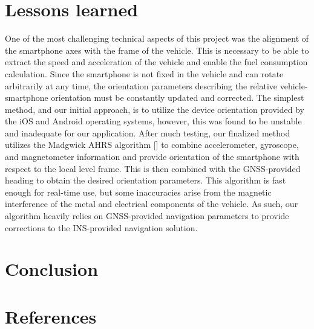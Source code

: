 \documentclass[11pt, oneside]{article}
\newcounter{refno}
\newcommand{\reflabel}[1]{\refstepcounter{refno}\label{#1}[\arabic{refno}]}  %
\begin{document}
\section{Lessons learned}

One of the most challenging technical aspects of this project was the alignment of the smartphone axes with the frame of the vehicle.  This is necessary to be able to extract the speed and acceleration of the vehicle and enable the fuel consumption calculation.  Since the smartphone is not fixed in the vehicle and can rotate arbitrarily at any time, the orientation parameters describing the relative vehicle-smartphone orientation must be constantly updated and corrected.  The simplest method, and our initial approach, is to utilize the device orientation provided by the iOS and Android operating systems, however, this was found to be unstable and inadequate for our application.  After much testing, our finalized method utilizes the Madgwick AHRS algorithm \reflabel{madgwick} to combine accelerometer, gyroscope, and magnetometer information and provide orientation of the smartphone with respect to the local level frame.  This is then combined with the GNSS-provided heading to obtain the desired orientation parameters.  This algorithm is fast enough for real-time use, but some inaccuracies arise from the magnetic interference of the metal and electrical components of the vehicle.  As such, our algorithm heavily relies on GNSS-provided navigation parameters to provide corrections to the INS-provided navigation solution.

\section{Conclusion}
 
\section{References}
\end{document}
